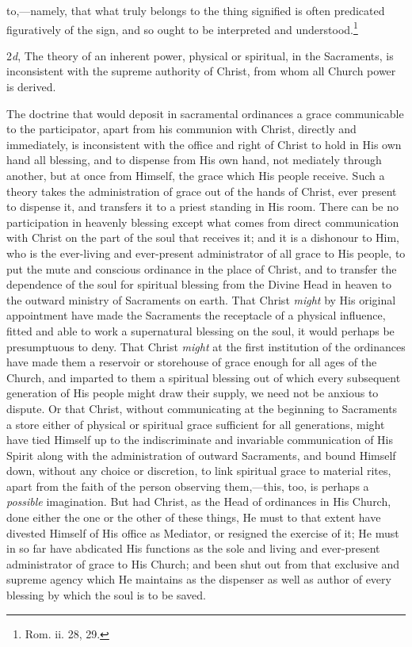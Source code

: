 \documentclass[]{book}
\begin{document}
to,---namely, that what truly belongs to the thing signified is often predicated figuratively of the sign, and so ought to be interpreted and understood.\footnote{Rom. ii. 28, 29.}

2\emph{d}, The theory of an inherent power, physical or spiritual, in the Sacraments, is inconsistent with the supreme authority of Christ, from whom all Church power is derived.

The doctrine that would deposit in sacramental ordinances a grace communicable to the participator, apart from his communion with Christ, directly and immediately, is inconsistent with the office and right of Christ to hold in His own hand all blessing, and to dispense from His own hand, not mediately through another, but at once from Himself, the grace which His people receive. Such a theory takes the administration of grace out of the hands of Christ, ever present to dispense it, and transfers it to a priest standing in His room. There can be no participation in heavenly blessing except what comes from direct communication with Christ on the part of the soul that receives it; and it is a dishonour to Him, who is the ever-living and ever-present administrator of all grace to His people, to put the mute and conscious ordinance in the place of Christ, and to transfer the dependence of the soul for spiritual blessing from the Divine Head in heaven to the outward ministry of Sacraments on earth. That Christ \emph{might} by His original appointment have made the Sacraments the receptacle of a physical influence, fitted and able to work a supernatural blessing on the soul, it would perhaps be presumptuous to deny. That Christ \emph{might} at the first institution of the ordinances have made them a reservoir or storehouse of grace enough for all ages of the Church, and imparted to them a spiritual blessing out of which every subsequent generation of His people might draw their supply, we need not be anxious to dispute. Or that Christ, without communicating at the beginning to Sacraments a store either of physical or spiritual grace sufficient for all generations, might have tied Himself up to the indiscriminate and invariable communication of His Spirit along with the administration of outward Sacraments, and bound Himself down, without any choice or discretion, to link spiritual grace to material rites, apart from the faith of the person observing them,---this, too, is perhaps a \emph{possible} imagination. But had Christ, as the Head of ordinances in His Church, done either the one or the other of these things, He must to that extent have divested Himself of His office as Mediator, or resigned the exercise of it; He must in so far have abdicated His functions as the sole and living and ever-present administrator of grace to His Church; and been shut out from that exclusive and supreme agency which He maintains as the dispenser as well as author of every blessing by which the soul is to be saved.
\end{document}
